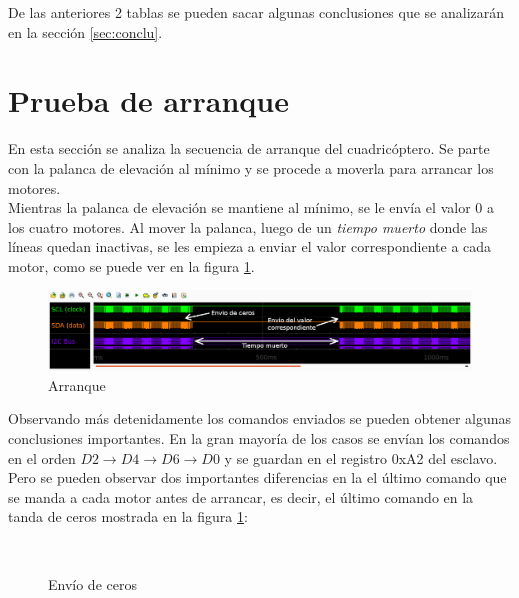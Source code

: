 \documentclass[main]{subfiles}
\begin{document}
De las anteriores 2 tablas se pueden sacar algunas conclusiones que se analizar\'an en la secci\'on \ref{sec:conclu}.

\section{Prueba de arranque}
\label{sec:arranque}

En esta secci\'on se analiza la secuencia de arranque del cuadric\'optero. Se parte con la palanca de elevaci\'on al m\'inimo y se procede a moverla para arrancar los motores.\\

Mientras la palanca de elevaci\'on se mantiene al m\'inimo, se le env\'ia el valor 0 a los cuatro motores. Al mover la palanca, luego de un \emph{tiempo muerto} donde las l\'ineas quedan inactivas, se les empieza a enviar el valor correspondiente a cada motor, como se puede ver en la figura \ref{fig:snif_arranque_lejos}.

\begin{figure}[h!]
	\centering
	\includegraphics[width=1\textwidth]{./pics_sniffer/snif_arranque_lejos.png}
	\caption{Arranque}
	\label{fig:snif_arranque_lejos}
\end{figure}

Observando m\'as detenidamente los comandos enviados se pueden obtener algunas conclusiones importantes. En la gran mayor\'ia de los casos se env\'ian los comandos en el orden $D2\rightarrow D4\rightarrow D6\rightarrow D0$ y se guardan en el registro 0xA2 del esclavo. Pero se pueden observar dos importantes diferencias en la el \'ultimo comando que se manda a cada motor antes de arrancar, es decir, el \'ultimo comando en la tanda de ceros mostrada en la figura \ref{fig:snif_arranque_lejos}:

\begin{figure} [h!]
\centering
   \\
  \caption{Env\'io de ceros}
  \label{fig:snif_arranque_cerca}
\end{figure}
\end{document}
